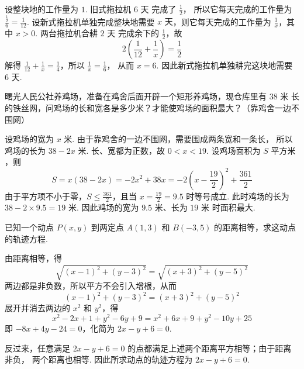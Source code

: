 \begin{solution}
设整块地的工作量为 \(1\). 旧式拖拉机 \(6\text{ 天}\) 完成了 \(\frac{1}{2}\)，
所以它每天完成的工作量为 \(\frac{\frac{1}{2}}{6}=\frac{1}{12}\). 设新式拖拉机单独完成整块地需要
\(x\text{ 天}\)，则它每天完成的工作量为 \(\frac{1}{x}\)，其中 \(x>0\).
两台拖拉机合耕 \(2\text{ 天}\) 完成余下的 \(\frac{1}{2}\)，故
\[
2\left(\frac{1}{12}+\frac{1}{x}\right)=\frac{1}{2}
\]
解得 \(\frac{1}{12}+\frac{1}{x}=\frac{1}{4}\)，所以 \(\frac{1}{x}=\frac{1}{6}\)，
从而 \(x=6\). 因此新式拖拉机单独耕完这块地需要 \(6\text{ 天}\).
\end{solution}

\begin{problem}
曙光人民公社养鸡场，准备在鸡舍后面开辟一个矩形养鸡场，现仓库里有 \(38\text{ 米}\) 长的铁丝网，问鸡场的长和宽各是多少米？才能使鸡场的面积最大？（靠鸡舍一边不围网）
\end{problem}

\begin{solution}
设鸡场的宽为 \(x\text{ 米}\). 由于靠鸡舍的一边不围网，需要围成两条宽和一条长，
所以鸡场的长为 \(38-2x\text{ 米}\). 长、宽都为正数，故 \(0<x<19\).
设鸡场面积为 \(S\text{ 平方米}\)，则
\[
S=x(38-2x)=-2x^2+38x=-2\left(x-\frac{19}{2}\right)^2+\frac{361}{2}
\]
由于平方项不小于零，\(S\leqslant\frac{361}{2}\)，且当
\(x=\frac{19}{2}=9.5\) 时等号成立. 此时鸡场的长为
\(38-2\times9.5=19\text{ 米}\). 因此鸡场的宽为 \(9.5\text{ 米}\)、长为
\(19\text{ 米}\) 时面积最大.
\end{solution}

\begin{problem}
已知一个动点 \(P(x,y)\) 到两定点 \(A(1,3)\) 和 \(B(-3,5)\) 的距离相等，求这动点的轨迹方程.
\end{problem}

\begin{solution}
由距离相等，得
\[
\sqrt{(x-1)^2+(y-3)^2}=\sqrt{(x+3)^2+(y-5)^2}
\]
两边都是非负数，所以平方不会引入增根，从而
\[
(x-1)^2+(y-3)^2=(x+3)^2+(y-5)^2
\]
展开并消去两边的 \(x^2\) 和 \(y^2\)，得
\[
x^2-2x+1+y^2-6y+9=x^2+6x+9+y^2-10y+25
\]
即 \(-8x+4y-24=0\)，化简为 \(2x-y+6=0\).

反过来，任意满足 \(2x-y+6=0\) 的点都满足上述两个距离平方相等；由于距离非负，
两个距离也相等. 因此所求动点的轨迹方程为 \(2x-y+6=0\).
\end{solution}

